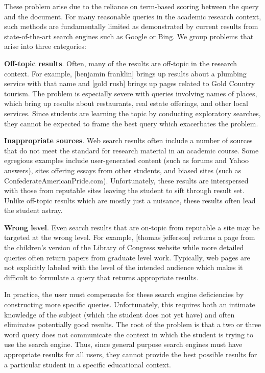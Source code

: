 \documentclass[pdfpagelabels=false,plainpages=true]{acm_proc_article-sp}
\begin{document}
These problem arise due to the reliance on term-based scoring between
the query and the document. For many reasonable queries in the academic research
context, such methods are fundamentally limited as demonstrated by current
results from state-of-the-art search engines such as Google or Bing. We group
problems that arise into three categories: 

{\bf Off-topic results}. Often, many of the results are off-topic in the
research context. For example, [benjamin franklin] brings up results about a
plumbing service with that name and [gold rush] brings up pages related to Gold
Country tourism. The problem is especially severe with queries involving
names of places, which bring up results about restaurants, real estate
offerings, and other local services. Since students are learning the topic by
conducting exploratory searches, they cannot be expected to frame the best query
which exacerbates the problem. 

{\bf Inappropriate sources}. Web search results often include a number of sources
that do not meet the standard for research material in an academic course. Some
egregious examples include user-generated content (such as forums and Yahoo answers), 
sites offering essays from other students, and biased sites (such as
ConfederateAmericanPride.com). Unfortunately, these results are interspersed
with those from reputable sites leaving the student to sift through result
set. Unlike off-topic results which are mostly just a nuisance, these results
often lead the student astray.   

{\bf Wrong level}. Even search results that are on-topic from reputable
a site may be targeted at the wrong level. For example, [thomas jefferson]
returns a page from the children's version of the Library of Congress
website while  more detailed queries often return papers from graduate level
work. Typically, web pages are not explicitly labeled with the level of
the intended audience which makes it difficult to formulate a query that
returns appropriate results.

In practice, the user must compensate for these search engine deficiencies by
constructing more specific queries. Unfortunately, this requires both an
intimate knowledge of the subject (which the student does not yet
have) and often eliminates potentially good results. The root of the problem is
that a two or three word query does not communicate the context in which the
student is trying to use the search engine. Thus, since general purpose
search engines must have appropriate results for all users, they cannot
provide the best possible results for a particular student in a specific
educational context. 
\end{document}
